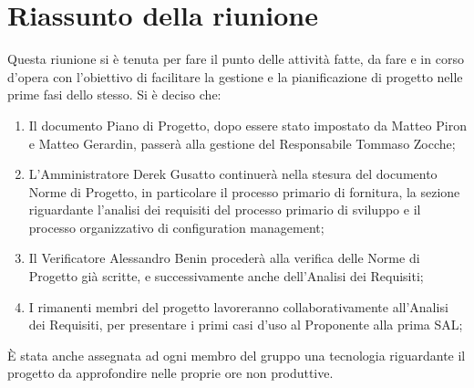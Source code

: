 \section{Riassunto della riunione}
Questa riunione si è tenuta per fare il punto delle attività fatte, da fare e in corso d'opera con l'obiettivo di facilitare la gestione e la pianificazione di progetto nelle prime fasi dello stesso.
Si è deciso che:
\begin{enumerate}
    \item Il documento Piano di Progetto, dopo essere stato impostato da Matteo Piron e Matteo Gerardin, passerà alla gestione del Responsabile Tommaso Zocche;
    \item L'Amministratore Derek Gusatto continuerà nella stesura del documento Norme di Progetto, in particolare il processo primario di fornitura, la sezione riguardante l'analisi dei requisiti del processo primario di sviluppo e il processo organizzativo di configuration management;
    \item Il Verificatore Alessandro Benin procederà alla verifica delle Norme di Progetto già scritte, e successivamente anche dell'Analisi dei Requisiti;
    \item I rimanenti membri del progetto lavoreranno collaborativamente all'Analisi dei Requisiti, per presentare i primi casi d'uso al Proponente alla prima SAL;
\end{enumerate}

È stata anche assegnata ad ogni membro del gruppo una tecnologia riguardante il progetto da approfondire nelle proprie ore non produttive.
 